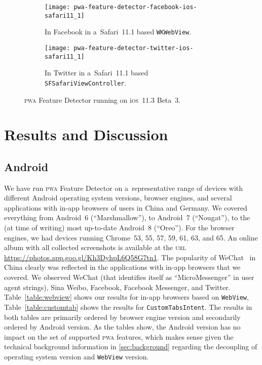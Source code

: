 \documentclass[sigconf,hyphens]{acmart}
\begin{document}
\begin{figure}[t]
  \centering
  \begin{subfigure}[t]{0.475\columnwidth}
    \texttt{[image: pwa-feature-detector-facebook-ios-safari11\_1]}
    \caption[\textsc{pwa} Feature Detector running in Facebook.]{
      In Facebook in a~Safari~11.1 based \texttt{WKWebView}.}
    \label{fig:facebook-ios-safari11_1}
  \end{subfigure}    
  \quad
  \begin{subfigure}[t]{0.475\columnwidth}  
    \texttt{[image: pwa-feature-detector-twitter-ios-safari11\_1]}
    \caption[\textsc{pwa} Feature Detector running in Twitter.]{
      In Twitter in a~Safari~11.1 based \texttt{SFSafariViewController}.}
    \label{fig:twitter-ios-safari11_1}
  \end{subfigure} 
  \caption{\textsc{pwa} Feature Detector running on i\textsc{os}~11.3 Beta~3.}       
\end{figure}

\section{Results and Discussion}
\label{sec:results-and-discussion}

\subsection{Android}

We have run \textsc{pwa} Feature Detector on a~representative range of devices
with different Android operating system versions, browser engines,
and several applications with in-app browsers of users in China and Germany.
We covered everything from Android~6 (``Marshmallow''),
to Android~7 (``Nougat''),
to the (at time of writing) most up-to-date Android~8 (``Oreo''). 
For the browser engines, we had devices running Chrome~53, 55, 57, 59, 61, 63, and 65.
An online album with all collected screenshots is available at the \textsc{url}
\url{https://photos.app.goo.gl/Kh3DyhpL6Q58G7tn1}.
The popularity of WeChat~\cite{chan2015wechat} in China clearly was reflected 
in the applications with in-app browsers that we covered.
We observed WeChat (that identifies itself as ``MicroMessenger'' in user agent strings),
Sina Weibo, Facebook, Facebook Messenger, and Twitter.
Table~\ref{table:webview} shows our results for in-app browsers based on
\texttt{WebView}, Table~\ref{table:customtab} shows the results for
\texttt{CustomTabsIntent}.
The results in both tables are primarily ordered by browser engine version
and secondarily ordered by Android version.
As the tables show, the Android version has no impact
on the set of supported \textsc{pwa} features,
which makes sense given the technical background information
in \autoref{sec:background} regarding the decoupling of operating system version
and \texttt{WebView} version.
\end{document}
